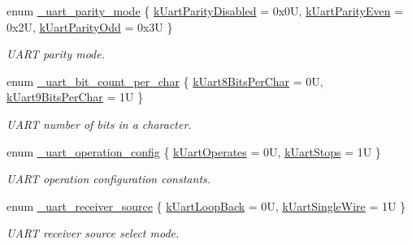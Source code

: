 \begin{DoxyCompactItemize}
\item 
enum \hyperlink{group__uart__hal_gadf9f66755acc340eab030e1a48e35e10}{\+\_\+uart\+\_\+parity\+\_\+mode} \{ \hyperlink{group__uart__hal_ggadf9f66755acc340eab030e1a48e35e10aaa442d2224e06b4118463ed49f3768d6}{k\+Uart\+Parity\+Disabled} = 0x0U, 
\hyperlink{group__uart__hal_ggadf9f66755acc340eab030e1a48e35e10a3f5ca507d31e770da03b9ca473b41469}{k\+Uart\+Parity\+Even} = 0x2U, 
\hyperlink{group__uart__hal_ggadf9f66755acc340eab030e1a48e35e10adc98b9d68156ba24739da03a52a0631f}{k\+Uart\+Parity\+Odd} = 0x3U
 \}\begin{DoxyCompactList}\small\item\em U\+A\+RT parity mode. \end{DoxyCompactList}
\item 
enum \hyperlink{group__uart__hal_ga09ceaf514baf3352c6c4a78155cbfd9d}{\+\_\+uart\+\_\+bit\+\_\+count\+\_\+per\+\_\+char} \{ \hyperlink{group__uart__hal_gga09ceaf514baf3352c6c4a78155cbfd9da39a5492922c7775dd7e0ad0cc394d9c7}{k\+Uart8\+Bits\+Per\+Char} = 0U, 
\hyperlink{group__uart__hal_gga09ceaf514baf3352c6c4a78155cbfd9da4c94ddc92496671dcc07f56665c423ab}{k\+Uart9\+Bits\+Per\+Char} = 1U
 \}\begin{DoxyCompactList}\small\item\em U\+A\+RT number of bits in a character. \end{DoxyCompactList}
\item 
enum \hyperlink{group__uart__hal_ga6691a4a7f6d91eab489a02a8d8acbec9}{\+\_\+uart\+\_\+operation\+\_\+config} \{ \hyperlink{group__uart__hal_gga6691a4a7f6d91eab489a02a8d8acbec9a103d89ec75d4d974582f99f43bc64117}{k\+Uart\+Operates} = 0U, 
\hyperlink{group__uart__hal_gga6691a4a7f6d91eab489a02a8d8acbec9a0fa5187cd9ee9f9cde52d2730959d673}{k\+Uart\+Stops} = 1U
 \}\begin{DoxyCompactList}\small\item\em U\+A\+RT operation configuration constants. \end{DoxyCompactList}
\item 
enum \hyperlink{group__uart__hal_gae84554e8367780b93162f4c3a3c46082}{\+\_\+uart\+\_\+receiver\+\_\+source} \{ \hyperlink{group__uart__hal_ggae84554e8367780b93162f4c3a3c46082a4524676c69586c50a07c5eaf4c3c2a99}{k\+Uart\+Loop\+Back} = 0U, 
\hyperlink{group__uart__hal_ggae84554e8367780b93162f4c3a3c46082a15ae5b502a1ec1196b70b8a3fd9476fb}{k\+Uart\+Single\+Wire} = 1U
 \}\begin{DoxyCompactList}\small\item\em U\+A\+RT receiver source select mode. \end{DoxyCompactList}

\end{DoxyCompactItemize}

